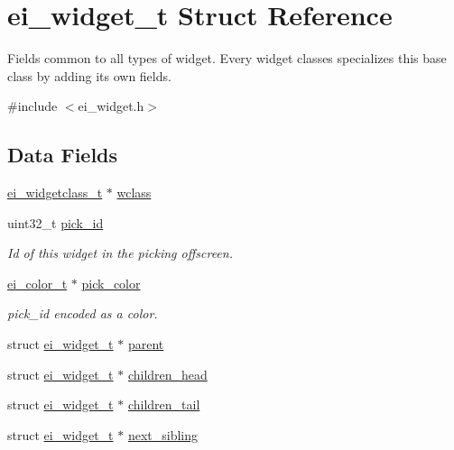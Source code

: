 \hypertarget{structei__widget__t}{\section{ei\-\_\-widget\-\_\-t Struct Reference}
\label{structei__widget__t}
}


Fields common to all types of widget. Every widget classes specializes this base class by adding its own fields.  




{\ttfamily \#include $<$ei\-\_\-widget.\-h$>$}

\subsection*{Data Fields}
\begin{DoxyCompactItemize}
\item 
\hyperlink{structei__widgetclass__t}{ei\-\_\-widgetclass\-\_\-t} $\ast$ \hyperlink{structei__widget__t_a429e970e1d266252df4dbe55296b9f70}{wclass}
\item 
uint32\-\_\-t \hyperlink{structei__widget__t_ada7ce878377d653d930a57e175b61182}{pick\-\_\-id}
\begin{DoxyCompactList}\small\item\em Id of this widget in the picking offscreen. \end{DoxyCompactList}\item 
\hyperlink{structei__color__t}{ei\-\_\-color\-\_\-t} $\ast$ \hyperlink{structei__widget__t_ad1477adf8e6b5cb6a5f11f657fe4781b}{pick\-\_\-color}
\begin{DoxyCompactList}\small\item\em pick\-\_\-id encoded as a color. \end{DoxyCompactList}\item 
struct \hyperlink{structei__widget__t}{ei\-\_\-widget\-\_\-t} $\ast$ \hyperlink{structei__widget__t_adb1b43eda89c8e86d6337c939f1a4473}{parent}
\item 
struct \hyperlink{structei__widget__t}{ei\-\_\-widget\-\_\-t} $\ast$ \hyperlink{structei__widget__t_a190316f0ec41d2d98b919414c860f828}{children\-\_\-head}
\item 
struct \hyperlink{structei__widget__t}{ei\-\_\-widget\-\_\-t} $\ast$ \hyperlink{structei__widget__t_aece2f3059f252538ae787857e7eea2a2}{children\-\_\-tail}
\item 
struct \hyperlink{structei__widget__t}{ei\-\_\-widget\-\_\-t} $\ast$ \hyperlink{structei__widget__t_ada15cedaf8e6e104a1461c1754ff6cb3}{next\-\_\-sibling}

\end{DoxyCompactItemize}
